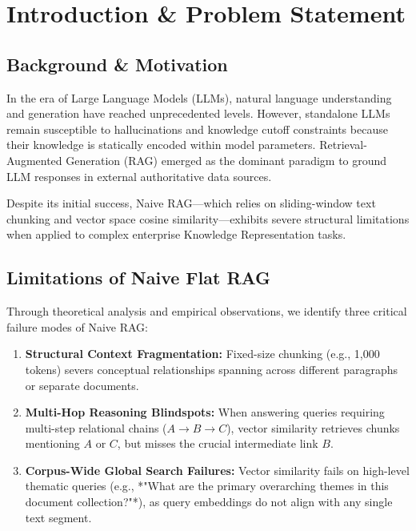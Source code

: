 \documentclass[11pt,a4paper]{report}
\begin{document}
\newpage
\tableofcontents
\newpage
\listoffigures
\listoftables
\newpage

\setcounter{page}{1}

\chapter{Introduction \& Problem Statement}

\section{Background \& Motivation}
In the era of Large Language Models (LLMs), natural language understanding and generation have reached unprecedented levels. However, standalone LLMs remain susceptible to hallucinations and knowledge cutoff constraints because their knowledge is statically encoded within model parameters. Retrieval-Augmented Generation (RAG) emerged as the dominant paradigm to ground LLM responses in external authoritative data sources.

Despite its initial success, Naive RAG—which relies on sliding-window text chunking and vector space cosine similarity—exhibits severe structural limitations when applied to complex enterprise Knowledge Representation tasks.

\section{Limitations of Naive Flat RAG}
Through theoretical analysis and empirical observations, we identify three critical failure modes of Naive RAG:
\begin{enumerate}
    \item \textbf{Structural Context Fragmentation:} Fixed-size chunking (e.g., 1,000 tokens) severs conceptual relationships spanning across different paragraphs or separate documents.
    \item \textbf{Multi-Hop Reasoning Blindspots:} When answering queries requiring multi-step relational chains ($A \to B \to C$), vector similarity retrieves chunks mentioning $A$ or $C$, but misses the crucial intermediate link $B$.
    \item \textbf{Corpus-Wide Global Search Failures:} Vector similarity fails on high-level thematic queries (e.g., *"What are the primary overarching themes in this document collection?"*), as query embeddings do not align with any single text segment.
\end{enumerate}
\end{document}
